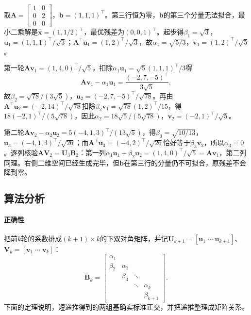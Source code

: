 \begin{example}[不相容矩形系统上的双对角化]
\label{ex:ls-golub-kahan-diagonal}
取$\bm A=\left[\begin{smallmatrix}1&0\\0&2\\0&0\end{smallmatrix}\right]$，$\bm b=(1,1,1)^\top$。第三行恒为零，$\bm b$的第三个分量无法拟合，最小二乘解是$\hat{\bm x}=(1,1/2)^\top$，最优残差为$(0,0,1)^\top$。起步得$\beta_1=\sqrt3$，$\bm u_1=(1,1,1)^\top/\sqrt3$；$\bm A^\top\bm u_1=(1,2)^\top/\sqrt3$，故$\alpha_1=\sqrt{5/3}$，$\bm v_1=(1,2)^\top/\sqrt5$。

第一轮$\bm A\bm v_1=(1,4,0)^\top/\sqrt5$，扣除$\alpha_1\bm u_1=\sqrt5(1,1,1)^\top/3$得
\[
 \bm A\bm v_1-\alpha_1\bm u_1=\frac{(-2,7,-5)^\top}{3\sqrt5},
\]
故$\beta_2=\sqrt{78}/(3\sqrt5)$，$\bm u_2=(-2,7,-5)^\top/\sqrt{78}$。再由$\bm A^\top\bm u_2=(-2,14)^\top/\sqrt{78}$扣除$\beta_2\bm v_1=\sqrt{78}(1,2)^\top/15$，得$18(-2,1)^\top/(5\sqrt{78})$，因此$\alpha_2=18\sqrt5/(5\sqrt{78})$，$\bm v_2=(-2,1)^\top/\sqrt5$。

第二轮$\bm A\bm v_2-\alpha_2\bm u_2=5(-4,1,3)^\top/(13\sqrt5)$，得$\beta_3=\sqrt{10/13}$，$\bm u_3=(-4,1,3)^\top/\sqrt{26}$；而$\bm A^\top\bm u_3=(-4,2)^\top/\sqrt{26}$恰好等于$\beta_3\bm v_2$，所以$\alpha_3=0$。逐列核验$\bm A\bm V_2=\bm U_3\bm B_2$：第一列$\alpha_1\bm u_1+\beta_2\bm u_2=(1,4,0)^\top/\sqrt5=\bm A\bm v_1$，第二列同理。右侧二维空间已经生成完毕，但$\bm b$在第三行的分量仍不可拟合，原残差不会降到零。
\end{example}

\subsection{算法分析}

\paragraph{正确性}
把前$k$轮的系数排成$(k+1)\times k$的下双对角矩阵，并记$\bm U_{k+1}=[\bm u_1\;\cdots\;\bm u_{k+1}]$、$\bm V_k=[\bm v_1\;\cdots\;\bm v_k]$：
\[
 \bm B_k=
 \begin{bmatrix}
 \alpha_1&&&\\
 \beta_2&\alpha_2&&\\
 &\beta_3&\ddots&\\
 &&\ddots&\alpha_k\\
 &&&\beta_{k+1}
 \end{bmatrix}.
\]
下面的定理说明，短递推得到的两组基确实标准正交，并把递推整理成矩阵关系。

